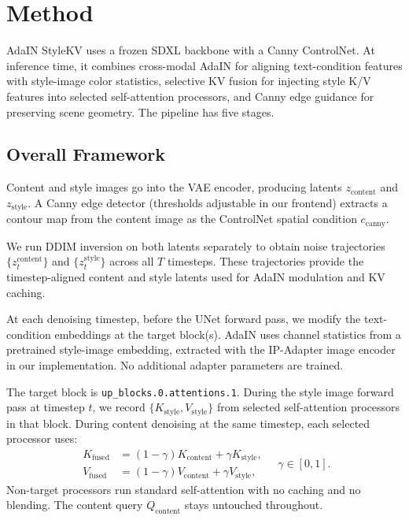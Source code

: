 \documentclass[10pt,twocolumn]{article}
\begin{document}
\section{Method}

AdaIN StyleKV uses a frozen SDXL backbone with a Canny ControlNet. At inference time, it combines cross-modal AdaIN for aligning text-condition features with style-image color statistics, selective KV fusion for injecting style K/V features into selected self-attention processors, and Canny edge guidance for preserving scene geometry. The pipeline has five stages.

\subsection{Overall Framework}

\medskip
{} Content and style images go into the VAE encoder, producing latents $z_{\text{content}}$ and $z_{\text{style}}$. A Canny edge detector (thresholds adjustable in our frontend) extracts a contour map from the content image as the ControlNet spatial condition $c_{\text{canny}}$.

\medskip
{} We run DDIM inversion on both latents separately to obtain noise trajectories $\{z_t^{\text{content}}\}$ and $\{z_t^{\text{style}}\}$ across all $T$ timesteps. These trajectories provide the timestep-aligned content and style latents used for AdaIN modulation and KV caching.

\medskip
{} At each denoising timestep, before the UNet forward pass, we modify the text-condition embeddings at the target block(s). AdaIN uses channel statistics from a pretrained style-image embedding, extracted with the IP-Adapter image encoder in our implementation. No additional adapter parameters are trained.

\medskip
{} The target block is \texttt{up\_blocks.0.attentions.1}. During the style image forward pass at timestep $t$, we record $\{K_{\text{style}}, V_{\text{style}}\}$ from selected self-attention processors in that block. During content denoising at the same timestep, each selected processor uses:
\[
\begin{aligned}
K_{\text{fused}} &= (1-\gamma)K_{\text{content}} + \gamma K_{\text{style}},\\
V_{\text{fused}} &= (1-\gamma)V_{\text{content}} + \gamma V_{\text{style}},
\end{aligned}
\quad \gamma \in [0,1].
\]
Non-target processors run standard self-attention with no caching and no blending. The content query $Q_{\text{content}}$ stays untouched throughout.
\end{document}
